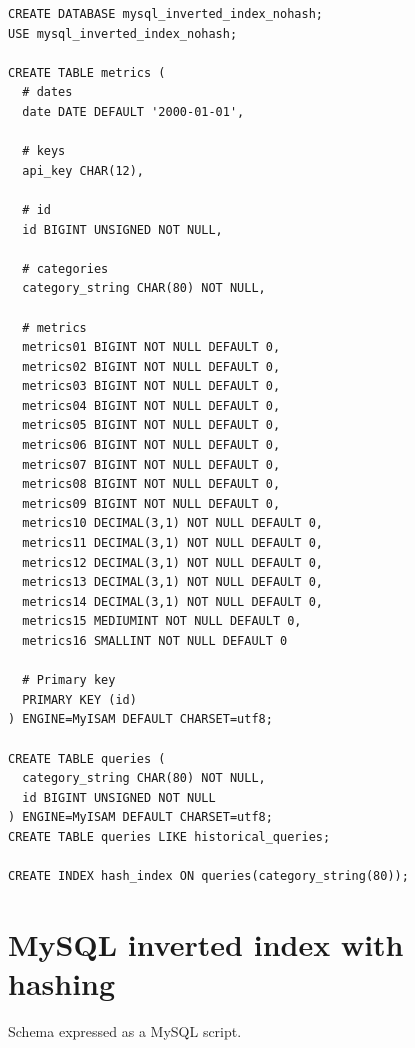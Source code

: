 \begin{verbatim}
CREATE DATABASE mysql_inverted_index_nohash;
USE mysql_inverted_index_nohash;

CREATE TABLE metrics ( 
  # dates
  date DATE DEFAULT '2000-01-01',

  # keys
  api_key CHAR(12),
  
  # id
  id BIGINT UNSIGNED NOT NULL,

  # categories
  category_string CHAR(80) NOT NULL,

  # metrics
  metrics01 BIGINT NOT NULL DEFAULT 0,
  metrics02 BIGINT NOT NULL DEFAULT 0,
  metrics03 BIGINT NOT NULL DEFAULT 0,
  metrics04 BIGINT NOT NULL DEFAULT 0,
  metrics05 BIGINT NOT NULL DEFAULT 0,
  metrics06 BIGINT NOT NULL DEFAULT 0,
  metrics07 BIGINT NOT NULL DEFAULT 0,
  metrics08 BIGINT NOT NULL DEFAULT 0,
  metrics09 BIGINT NOT NULL DEFAULT 0,
  metrics10 DECIMAL(3,1) NOT NULL DEFAULT 0,
  metrics11 DECIMAL(3,1) NOT NULL DEFAULT 0,
  metrics12 DECIMAL(3,1) NOT NULL DEFAULT 0,
  metrics13 DECIMAL(3,1) NOT NULL DEFAULT 0,
  metrics14 DECIMAL(3,1) NOT NULL DEFAULT 0,
  metrics15 MEDIUMINT NOT NULL DEFAULT 0,
  metrics16 SMALLINT NOT NULL DEFAULT 0
  
  # Primary key
  PRIMARY KEY (id)
) ENGINE=MyISAM DEFAULT CHARSET=utf8;
 
CREATE TABLE queries (
  category_string CHAR(80) NOT NULL,
  id BIGINT UNSIGNED NOT NULL
) ENGINE=MyISAM DEFAULT CHARSET=utf8;
CREATE TABLE queries LIKE historical_queries;

CREATE INDEX hash_index ON queries(category_string(80));
\end{verbatim}

\section{MySQL inverted index with hashing}

Schema expressed as a MySQL script.

